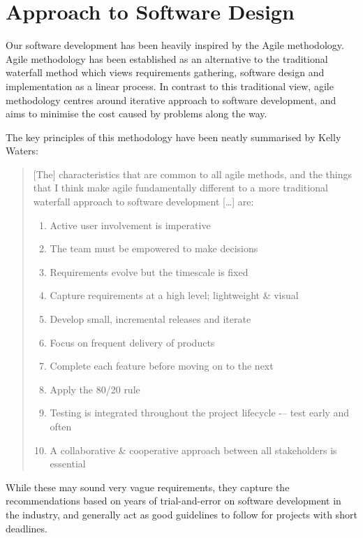 \section{Approach to Software Design}
\label{sec:design_considerations}

Our software development has been heavily inspired by the Agile methodology\cite{_manifesto_????}.
Agile methodology has been established as an alternative to the traditional waterfall method which views requirements gathering, software design and implementation as a linear process.
In contrast to this traditional view, agile methodology centres around iterative approach to software development, and aims to minimise the cost caused by problems along the way.

The key principles of this methodology have been neatly summarised by Kelly Waters\cite{_what_????}:

\blockquote{
    [The] characteristics that are common to all agile methods, and the things that I think make agile fundamentally different to a more traditional waterfall approach to software development [\ldots] are:
    
    \begin{enumerate}
        \item Active user involvement is imperative
        \item The team must be empowered to make decisions
        \item Requirements evolve but the timescale is fixed
        \item Capture requirements at a high level; lightweight \& visual
        \item Develop small, incremental releases and iterate
        \item Focus on frequent delivery of products
        \item Complete each feature before moving on to the next
        \item Apply the 80/20 rule
        \item Testing is integrated throughout the project lifecycle -– test early and often
        \item A collaborative \& cooperative approach between all stakeholders is essential
    \end{enumerate}
}

While these may sound very vague requirements, they capture the recommendations based on years of trial-and-error on software development in the industry, and generally act as good guidelines to follow for projects with short deadlines.

